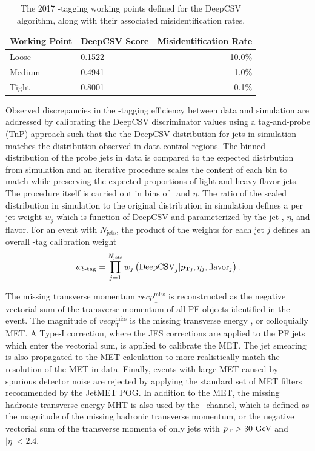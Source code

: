 \begin{table}[htbp]
  \caption[2017 DeepCSV Working Points]{The 2017 \qrkb-tagging working points defined for the DeepCSV algorithm, along with their associated misidentification rates.\cite{CMSBTAG}}
  \label{tbl:deepcsvwp}
  \begin{tabularx}{6.5in}{XXr}
    \hline
    Working Point & DeepCSV Score & Misidentification Rate \\
    \hline
    Loose         & 0.1522        & 10.0\%                 \\
    Medium        & 0.4941        & 1.0\%                  \\
    Tight         & 0.8001        & 0.1\%                  \\
    \hline
  \end{tabularx}
\end{table}

Observed discrepancies in the \qrkb-tagging efficiency between data and simulation are addressed by calibrating the DeepCSV discriminator values using a tag-and-probe (TnP) approach such that the the DeepCSV distribution for jets in simulation matches the distribution observed in data control regions. The binned distribution of the probe jets in data is compared to the expected distrbution from simulation and an iterative procedure scales the content of each bin to match while preserving the expected proportions of light and heavy flavor jets. The procedure itself is carried out in bins of \pT\ and $\eta$. The ratio of the scaled distribution in simulation to the original distribution in simulation defines a per jet weight $w_{j}$ which is function of DeepCSV and parameterized by the jet \pT, $\eta$, and flavor. For an event with $N_{\mathrm{jets}}$, the product of the weights for each jet $j$ defines an overall \qrkb-tag calibration weight
\begin{equation}
  w_{\qrkb\text{-}\mathrm{tag}} = \prod_{j=1}^{N_{\mathrm{jets}}} w_{j} \left( \mathrm{DeepCSV}_{j} | p_{\mathrm{T}j}, \eta_{j}, \mathrm{flavor}_{j} \right).
  \label{eq:btagweight}
\end{equation}

The missing transverse momentum $vec{p}_{\mathrm{T}}^{\mathrm{miss}}$ is reconstructed as the negative vectorial sum of the transverse momentum of all PF objects identified in the event. The magnitude of $vec{p}_{\mathrm{T}}^{\mathrm{miss}}$ is the missing transverse energy \pTmiss, or colloquially MET. A Type-I correction, where the JES corrections are applied to the PF jets which enter the vectorial sum, is applied to calibrate the MET. The jet smearing is also propagated to the MET calculation to more realistically match the resolution of the MET in data. Finally, events with large MET caused by spurious detector noise are rejected by applying the standard set of MET filters recommended by the JetMET POG. In addition to the MET, the missing hadronic transverse energy MHT is also used by the \ZnnH\ channel, which is defined as the magnitude of the missing hadronic transverse momentum, or the negative vectorial sum of the transverse momenta of only jets with $\pT > 30\ \GeV$ and $\left| \eta \right| < 2.4$.

